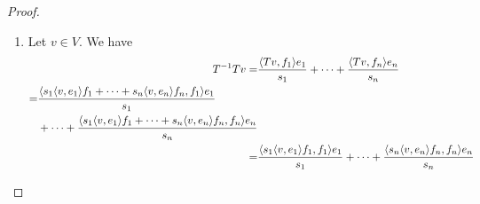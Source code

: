 \begin{proof}
\begin{enumerate}
     First,
     \begin{align*}
         \brackets{\sqrt{T^\ast T}v,v} =& \brackets{s_1\brackets{v,e_1}e_1 +\dots+ s_n\brackets{v,e_n}e_n,v}\\
         =& \brackets{s_1\brackets{v,e_1}e_1,v} +\dots+ \brackets{s_n\brackets{v,e_n}e_n,v}\\
         =& s_1\brackets{v,e_1}\brackets{e_1, v} +\dots+ s_n\brackets{v,e_n}\brackets{e_n,v}\\
         =& s_1\brackets{v,e_1}\overline{\brackets{v,e_1}} +\dots+ s_n\brackets{v,e_n}\overline{\brackets{v,e_n}}\geq 0.
     \end{align*}
     The last inequality follows because $z\overline{z}\geq 0$ for any complex number (see 4.5).

     Second, let $w\in V$,
     \begin{align*}
         \brackets{v,\sqrt{T^\ast T}^\ast w} =& \brackets{\sqrt{T^\ast T}v,w}\\
         =& \brackets{s_1\brackets{v,e_1}e_1,w} +\dots+ \brackets{s_n\brackets{v,e_n}e_n,w}\\
         =& s_1\brackets{v,e_1}\brackets{e_1, w} +\dots+ s_n\brackets{v,e_n}\brackets{e_n,w}\\
         =& \brackets{v,s_1\overline{\brackets{e_1, w}}e_1} +\dots+ \brackets{v,s_n\overline{\brackets{e_n,w}}e_n}\\
         =& \brackets{v,s_1\brackets{w, e_1}e_1} +\dots+ \brackets{v,s_n\brackets{w,e_n}e_n}\\
         =& \brackets{v,s_1\brackets{w, e_1}e_1 +\dots+ s_n\brackets{w,e_n}e_n} = \brackets{v,\sqrt{T^\ast T}},
     \end{align*}
     so that $\sqrt{T^\ast T}$ is self-adjoint, finalising our proof.
     \item Let $v\in V$. We have 
     \begin{align*}
         T^{-1}Tv =& \frac{\brackets{Tv,f_1}e_1}{s_1}+\dots+\frac{\brackets{Tv,f_n}e_n}{s_n}\\
         \begin{split}
             =& \frac{\brackets{s_1\brackets{v,e_1}f_1+\dots+s_n\brackets{v,e_n}f_n,f_1}e_1}{s_1}\\
             &+\dots+\frac{\brackets{s_1\brackets{v,e_1}f_1+\dots+s_n\brackets{v,e_n}f_n,f_n}e_n}{s_n}
         \end{split}\\
         =& \frac{\brackets{s_1\brackets{v,e_1}f_1, f_1}e_1}
         {s_1}+\dots+\frac{\brackets{s_n\brackets{v,e_n}f_n,f_n}e_n}{s_n}\\

\end{align*}
\end{enumerate}
\end{proof}
